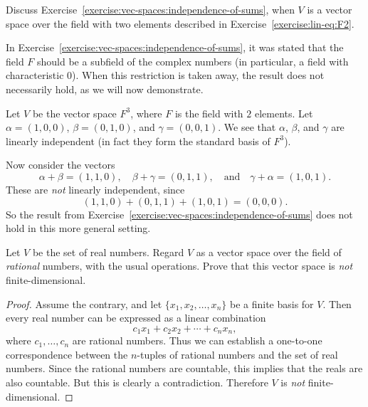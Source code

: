  Discuss
Exercise~\ref{exercise:vec-spaces:independence-of-sums}, when $V$ is a
vector space over the field with two elements described in
Exercise~\ref{exercise:lin-eq:F2}.
\begin{solution}
  In Exercise~\ref{exercise:vec-spaces:independence-of-sums}, it was
  stated that the field $F$ should be a subfield of the complex
  numbers (in particular, a field with characteristic $0$). When this
  restriction is taken away, the result does not necessarily hold, as
  we will now demonstrate.

  Let $V$ be the vector space $F^3$, where $F$ is the field with $2$
  elements. Let $\alpha = (1, 0, 0)$, $\beta = (0, 1, 0)$, and
  $\gamma = (0, 0, 1)$. We see that $\alpha$, $\beta$, and $\gamma$
  are linearly independent (in fact they form the standard basis of
  $F^3$).

  Now consider the vectors
  \begin{equation*}
    \alpha + \beta = (1, 1, 0), \quad
    \beta + \gamma = (0, 1, 1), \quad\text{and}\quad
    \gamma + \alpha = (1, 0, 1).
  \end{equation*}
  These are {\em not} linearly independent, since
  \begin{equation*}
    (1, 1, 0) + (0, 1, 1) + (1, 0, 1) = (0, 0, 0).
  \end{equation*}
  So the result from
  Exercise~\ref{exercise:vec-spaces:independence-of-sums} does not
  hold in this more general setting.
\end{solution}

 Let $V$ be the set of real numbers. Regard $V$ as a
vector space over the field of {\em rational} numbers, with the usual
operations. Prove that this vector space is {\em not}
finite-dimensional.
\begin{proof}
  Assume the contrary, and let $\{x_1,x_2,\dots,x_n\}$ be a finite
  basis for $V$. Then every real number can be expressed as a linear
  combination
  \begin{equation*}
    c_1x_1 + c_2x_2 + \cdots + c_nx_n,
  \end{equation*}
  where $c_1,\dots,c_n$ are rational numbers. Thus we can establish a
  one-to-one correspondence between the $n$-tuples of rational numbers
  and the set of real numbers. Since the rational numbers are
  countable, this implies that the reals are also countable. But this
  is clearly a contradiction. Therefore $V$ is {\em not}
  finite-dimensional.
\end{proof}
